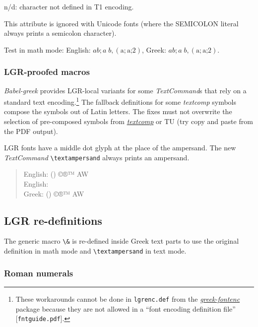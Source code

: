 \documentclass[a4paper]{article}
\newcommand{\file}{\texttt}
\newcommand{\cs}[1]{\texttt{\textbackslash#1}}
\newcommand{\pkgref}[1]{\emph{\href{https://ctan.org/pkg/#1}{#1}}}
\begin{document}
{\footnotesize n/d}: character not defined in T1 encoding.

This attribute is ignored with Unicode fonts (where the SEMICOLON literal
always prints a semicolon character).

Test in math mode:
\newcommand{\semicolontest}{$a b; a\;b, (\mathrm{a;}\textrm{a;}2)$}
English: \semicolontest, Greek: \foreignlanguage{greek}{\semicolontest}.

\subsubsection{LGR-proofed macros}

\emph{Babel-greek} provides LGR-local variants for some
\emph{TextCommand}s that rely on a standard text encoding.\footnote{%
  These workarounds cannot be done in \file{lgrenc.def} from the
  \pkgref{greek-fontenc} package because they are not allowed in a
  ``font encoding definition file'' [\file{fntguide.pdf}].}
The fallback definitions for some \emph{textcomp} symbols compose the
symbols out of Latin letters.
The fixes must not overwrite the selection of pre-composed symbols
from \pkgref{textcomp} or TU (try copy and paste from the PDF output).

LGR fonts have a middle dot glyph at the place of the ampersand. The new
\emph{TextCommand} \verb|\textampersand| always prints an ampersand.
\makeatletter \newcommand{\AsciiSymbolTest}{(\f@encoding) ©®™
                          A\textampersand W}
\makeatother
\begin{quote}
  English: \AsciiSymbolTest\\
  English: \ensuregreek{\AsciiSymbolTest}\\
  Greek: \foreignlanguage{greek}{\AsciiSymbolTest}
\end{quote}


\ifdefined\lgrfont%

  \subsection{LGR re-definitions \label{sec:LGR-redefinitions}}

  The generic macro \verb|\&| is re-defined inside Greek text parts to use
  the original definition in math mode and \cs{textampersand} in text
  mode.

  \subsubsection{Roman numerals \label{sec:roman-numerals}}
\end{document}
